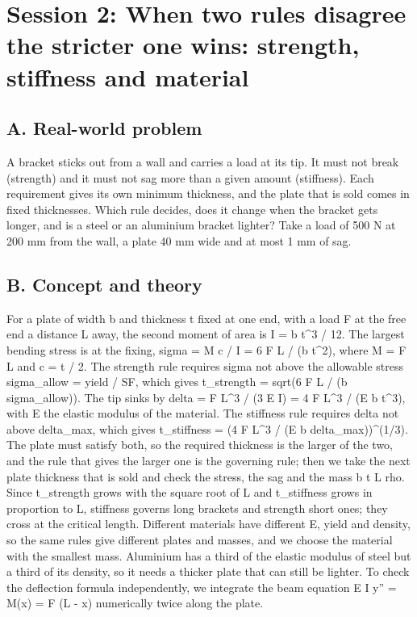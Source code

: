 \documentclass[11pt,a4paper]{article}
\begin{document}
\section{Session 2: When two rules disagree the stricter one wins: strength, stiffness and material}

\subsection*{A. Real-world problem}
A bracket sticks out from a wall and carries a load at its tip. It must not break (strength) and it must not sag more than a given amount (stiffness). Each requirement gives its own minimum thickness, and the plate that is sold comes in fixed thicknesses. Which rule decides, does it change when the bracket gets longer, and is a steel or an aluminium bracket lighter? Take a load of 500 N at 200 mm from the wall, a plate 40 mm wide and at most 1 mm of sag.

\subsection*{B. Concept and theory}
For a plate of width b and thickness t fixed at one end, with a load F at the free end a distance L away, the second moment of area is I = b t\textasciicircum{}3 / 12. The largest bending stress is at the fixing, sigma = M c / I = 6 F L / (b t\textasciicircum{}2), where M = F L and c = t / 2. The strength rule requires sigma not above the allowable stress sigma\_allow = yield / SF, which gives t\_strength = sqrt(6 F L / (b sigma\_allow)). The tip sinks by delta = F L\textasciicircum{}3 / (3 E I) = 4 F L\textasciicircum{}3 / (E b t\textasciicircum{}3), with E the elastic modulus of the material. The stiffness rule requires delta not above delta\_max, which gives t\_stiffness = (4 F L\textasciicircum{}3 / (E b delta\_max))\textasciicircum{}(1/3). The plate must satisfy both, so the required thickness is the larger of the two, and the rule that gives the larger one is the governing rule; then we take the next plate thickness that is sold and check the stress, the sag and the mass b t L rho. Since t\_strength grows with the square root of L and t\_stiffness grows in proportion to L, stiffness governs long brackets and strength short ones; they cross at the critical length. Different materials have different E, yield and density, so the same rules give different plates and masses, and we choose the material with the smallest mass. Aluminium has a third of the elastic modulus of steel but a third of its density, so it needs a thicker plate that can still be lighter. To check the deflection formula independently, we integrate the beam equation E I y'' = M(x) = F (L - x) numerically twice along the plate.
\end{document}
